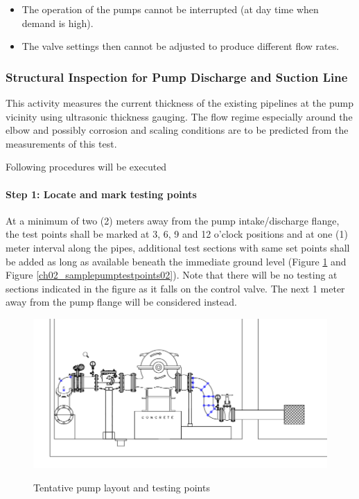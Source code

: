\begin{itemize}
\item The operation of the pumps cannot be interrupted (at day time when demand is high).
\item The valve settings then cannot be adjusted to produce different flow rates.
\end{itemize}

\subsubsection{Structural Inspection for Pump Discharge and Suction Line}

This activity measures the current thickness of the existing pipelines at the pump vicinity using ultrasonic thickness gauging. The flow regime especially around the elbow and possibly corrosion and scaling conditions are to be predicted from the measurements of this test.

Following procedures will be executed

\paragraph{Step 1: Locate and mark testing points}
At a minimum of two (2) meters away from the pump intake/discharge flange, the test points shall be marked at 3, 6, 9 and 12 o’clock positions and at one (1) meter interval along the pipes, additional test sections with same set points shall be added as long as available beneath the immediate ground level (Figure \ref{ch02_samplepumptestpoints01} and Figure \ref{ch02_samplepumptestpoints02}). Note that there will be no testing at sections indicated in the figure as it falls on the control valve. The next 1 meter away from the pump flange will be considered instead.

\begin{figure}[!htb]
	\includegraphics[scale=0.5]{figures/ch02_samplepumptestpoints01} \\
	\caption{Tentative pump layout and testing points}
	\label{ch02_samplepumptestpoints01} 
\end{figure}

